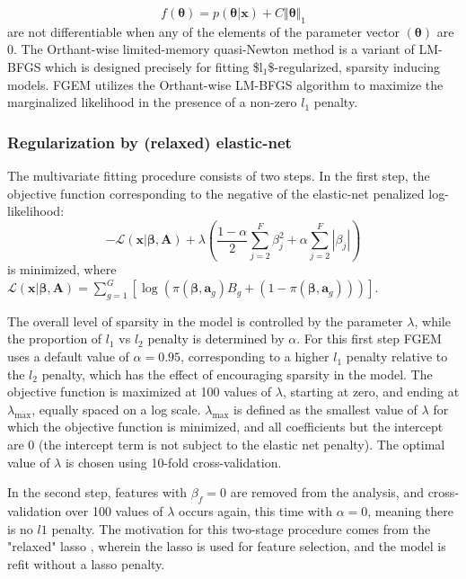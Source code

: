 $$f(\boldsymbol{\theta})=p(\boldsymbol{\theta} | \textbf{x}) + C \Vert \boldsymbol{\theta} \Vert_1$$ are not differentiable when any of the elements of the parameter vector $(\boldsymbol{\theta})$ are 0.  The Orthant-wise limited-memory quasi-Newton method is a variant of LM-BFGS which is designed precisely for fitting \$l\(_{\text{1}}\)\$-regularized, sparsity inducing models.  FGEM utilizes the Orthant-wise LM-BFGS algorithm to maximize the marginalized likelihood in the presence of a non-zero $l_{\text{1}}$ penalty.
 
\subsubsection{Regularization by (relaxed) elastic-net}\label{sec:orge3a8031}

The multivariate fitting procedure consists of two steps.  In the first step, the objective function corresponding to the negative of the elastic-net penalized log-likelihood:
$$ -\mathcal{L}(\textbf{x}|\boldsymbol{\beta},\textbf{A}) + \lambda\left( \frac{1-\alpha}{2} \sum_{j=2}^F\beta_j^2 + \alpha \sum_{j=2}^F|\beta_j| \right) $$
is minimized, where \(\mathcal{L}(\textbf{x}|\boldsymbol{\beta},\textbf{A}) = \sum_{g=1}^{G}[\log\left(\pi(\boldsymbol{\beta},\textbf{a}_g)B_g+(1-\pi(\boldsymbol{\beta},\textbf{a}_g))\right)]\).
 

The overall level of sparsity in the model is controlled by the parameter \(\lambda\), while the proportion of \(l_1\) vs \(l_2\) penalty is determined by \(\alpha\).  For this first step FGEM uses a default value of $\alpha=0.95$, corresponding to a higher $l_{\text{1}}$ penalty relative to the $l_{\text{2}}$ penalty, which has the effect of encouraging sparsity in the model. The objective function is maximized at 100 values of \(\lambda\), starting at zero, and ending at \(\lambda_{\text{max}}\), equally spaced on a log scale.  \(\lambda_{\text{max}}\) is defined as the smallest value of \(\lambda\) for which the objective function is minimized, and all coefficients but the intercept are 0 (the intercept term is not subject to the elastic net penalty). The optimal value of \(\lambda\) is chosen using 10-fold cross-validation.  

In the second step, features with \(\beta_f=0\) are removed from the analysis, and cross-validation over 100 values of \(\lambda\) occurs again, this time with \(\alpha = 0\), meaning there is no \(l1\) penalty.  The motivation for this two-stage
procedure comes from the "relaxed" lasso \cite{hastie17_exten_compar_best_subset_selec}, wherein the lasso is used for feature selection, and the model is refit without a lasso penalty.  

